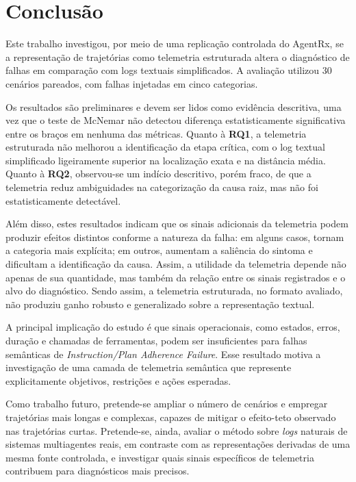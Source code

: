 \documentclass[sigconf]{acmart}
\begin{document}
\section{Conclusão}

Este trabalho investigou, por meio de uma replicação controlada do AgentRx, se a representação de trajetórias como
telemetria estruturada altera o diagnóstico de falhas em comparação com logs textuais simplificados. A avaliação
utilizou 30 cenários pareados, com falhas injetadas em cinco categorias.

Os resultados são preliminares e devem ser lidos como evidência descritiva, uma vez que o teste de McNemar não detectou
diferença estatisticamente significativa entre os braços em nenhuma das métricas. Quanto à \textbf{RQ1}, a telemetria
estruturada não melhorou a identificação da etapa crítica, com o log textual simplificado ligeiramente superior na
localização exata e na distância média. Quanto à \textbf{RQ2}, observou-se um indício descritivo, porém fraco, de que a
telemetria reduz ambiguidades na categorização da causa raiz, mas não foi estatisticamente detectável.

Além disso, estes resultados indicam que os sinais adicionais da telemetria podem produzir efeitos distintos conforme a
natureza da falha: em alguns casos, tornam a categoria mais explícita; em outros, aumentam a saliência do sintoma e
dificultam a identificação da causa. Assim, a utilidade da telemetria depende não apenas de sua quantidade, mas também
da relação entre os sinais registrados e o alvo do diagnóstico. Sendo assim, a telemetria estruturada, no formato
avaliado, não produziu ganho robusto e generalizado sobre a representação textual.

A principal implicação do estudo é que sinais operacionais, como estados, erros, duração e chamadas de ferramentas,
podem ser insuficientes para falhas semânticas de \textit{Instruction/Plan Adherence Failure}. Esse resultado motiva a
investigação de uma camada de telemetria semântica que represente explicitamente objetivos, restrições e ações
esperadas.

Como trabalho futuro, pretende-se ampliar o número de cenários e empregar trajetórias mais longas e complexas, capazes
de mitigar o efeito-teto observado nas trajetórias curtas. Pretende-se, ainda, avaliar o método sobre \textit{logs}
naturais de sistemas multiagentes reais, em contraste com as representações derivadas de uma mesma fonte controlada, e
investigar quais sinais específicos de telemetria contribuem para diagnósticos mais precisos.
\end{document}

